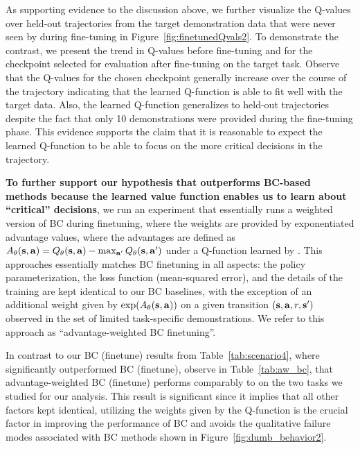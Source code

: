 \documentclass[conference]{IEEEtran}
\begin{document}
{As supporting evidence} to the discussion above, we further visualize the Q-values over held-out trajectories from the target demonstration data that were never seen by \methodname during fine-tuning in {Figure~\ref{fig:finetunedQvals2}}. To demonstrate the contrast, we present the trend in Q-values before fine-tuning and for the checkpoint selected for evaluation after fine-tuning on the target task. Observe that the Q-values for the chosen checkpoint generally increase over the course of the trajectory indicating that the learned Q-function is able to fit well with the target data. Also, the learned Q-function generalizes to held-out trajectories despite the fact that only 10 demonstrations were provided during the fine-tuning phase. This evidence supports the claim that it is reasonable to expect the learned Q-function to be able to focus on the more critical decisions in the trajectory.

\textbf{To further support our hypothesis that \methodname outperforms BC-based methods because the learned value function enables us to learn about ``critical'' decisions}, we run an experiment that essentially runs a weighted version of BC during finetuning, where the weights are provided by exponentiated advantage values, where the advantages are defined as $A_\theta(\mathbf{s}, \mathbf{a}) = Q_\theta(\mathbf{s}, \mathbf{a}) - \max_{\mathbf{a}'} Q_\theta(\mathbf{s}, \mathbf{a}')$ under a Q-function learned by \methodname. This approaches essentially matches BC finetuning in all aspects: the policy parameterization, the loss function (mean-squared error), and the details of the training are kept identical to our BC baselines, with the exception of an additional weight given by $\exp(A_\theta(\mathbf{s}, \mathbf{a}))$ on a given transition $(\mathbf{s}, \mathbf{a}, r, \mathbf{s}')$ observed in the set of limited task-specific demonstrations. We refer to this approach as ``advantage-weighted BC finetuning''.

In contrast to our BC (finetune) results from Table~\ref{tab:scenario4}, where \methodname significantly outperformed BC (finetune), observe in Table~\ref{tab:aw_bc}, that advantage-weighted BC (finetune) performs comparably to \methodname on the two tasks we studied for our analysis. This result is significant since it implies that all other factors kept identical, utilizing the weights given by the Q-function is the crucial factor in improving the performance of BC and avoids the qualitative failure modes associated with BC methods shown in Figure~\ref{fig:dumb_behavior2}.
\end{document}
